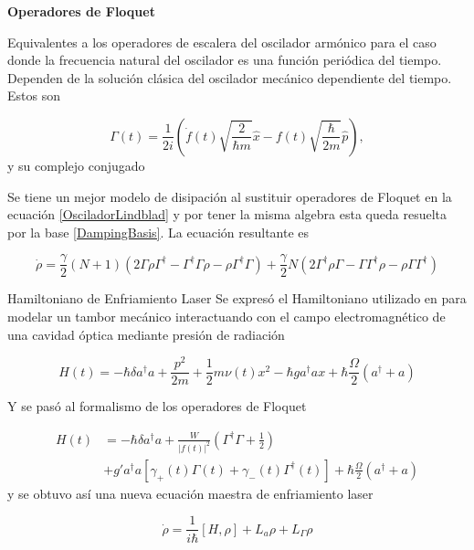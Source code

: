 \documentclass[11pt]{beamer}
\begin{document}
\begin{frame}
\textbf{Operadores de Floquet}

Equivalentes a los operadores de escalera del oscilador armónico para el caso donde la frecuencia natural del oscilador es una función periódica del tiempo. Dependen de la solución clásica del oscilador mecánico dependiente del tiempo. Estos son

\begin{equation}
\Gamma(t) = \frac{1}{2i}(\dot{f}(t)\sqrt{\frac{2}{\hbar m}}\hat{x}-f(t)\sqrt{\frac{\hbar}{2m}}\hat{p}),
\end{equation} y su complejo conjugado

\end{frame}

\begin{frame}
Se tiene un mejor modelo de disipación al sustituir operadores de Floquet en la ecuación \eqref{OsciladorLindblad} y por tener la misma algebra esta queda resuelta por la base \eqref{DampingBasis}. La ecuación resultante es

\begin{equation} \label{GammaLindblat}
\dot{\rho}=\frac{\gamma}{2}(N+1)(2\Gamma\rho\Gamma^\dagger - \Gamma^\dagger\Gamma \rho - \rho \Gamma^\dagger \Gamma )
 + \frac{\gamma}{2}N(2\Gamma^\dagger \rho \Gamma - \Gamma \Gamma^\dagger \rho - \rho \Gamma\Gamma^\dagger)
\end{equation}
\end{frame}

\begin{frame}{Hamiltoniano de Enfriamiento Laser}
Se expresó el Hamiltoniano utilizado en \cite{BarberisLC} para modelar un tambor mecánico interactuando con el campo electromagnético de una cavidad óptica mediante presión de radiación

\begin{equation}
H(t) = -\hbar \delta a^\dagger a + \frac{p^2}{2m} + \frac{1}{2}m \nu (t) x^2 -\hbar g a^\dagger a x + \hbar\frac{\Omega}{2}(a^\dagger + a)
\end{equation}

Y se pasó al formalismo de los operadores de Floquet

\end{frame}

\begin{frame}
\begin{align}
H(t) &= \nonumber -\hbar \delta a^\dagger a + \frac{W}{|f(t)|^2}(\Gamma^\dagger \Gamma + \frac{1}{2}) \\
&+  g'a^\dagger a[\gamma_+(t)\Gamma (t) +\gamma_-(t)\Gamma^\dagger (t)] + \hbar\frac{\Omega}{2}(a^\dagger + a)
\end{align} y se obtuvo así una nueva ecuación maestra de enfriamiento laser

\begin{equation}
\dot{\rho} = \frac{1}{i\hbar}[H,\rho] + L_a\rho + L_\Gamma \rho
\end{equation}
\end{frame}
\end{document}
